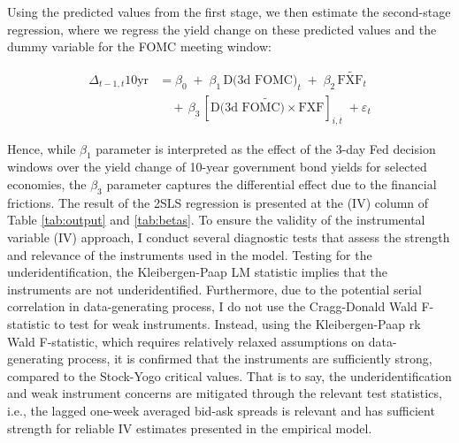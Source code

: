 \noindent Using the predicted values from the first stage, we then estimate the second-stage regression, where we regress the yield change on these predicted values and the dummy variable for the FOMC meeting window:

$$
\begin{aligned}
\Delta_{t-1,t}10\textrm{yr} &= \beta_0\;+\;\beta_1\,\textrm{D(3d FOMC)}_t\;+\;\beta_2\, \widetilde{\textrm{FXF}_t} \\&\quad +\,\beta_3 \, [\widetilde{\textrm{D(3d FOMC})\times\textrm{FXF}}]_{i,t}\; + \varepsilon_t
\end{aligned}
$$
\vspace{0.25cm}

Hence, while $\beta_1$ parameter is interpreted as the effect of the 3-day Fed decision windows over the yield change of 10-year government bond yields for selected economies, the $\beta_3$ parameter captures the differential effect due to the financial frictions. The result of the 2SLS regression is presented at the (IV) column of Table \ref{tab:output} and \ref{tab:betas}. To ensure the validity of the instrumental variable (IV) approach, I conduct several diagnostic tests that assess the strength and relevance of the instruments used in the model. Testing for the underidentification, the Kleibergen-Paap LM statistic implies that the instruments are not underidentified. Furthermore, due to the potential serial correlation in data-generating process, I do not use the Cragg-Donald Wald F-statistic to test for weak instruments. Instead, using the Kleibergen-Paap rk Wald F-statistic, which requires relatively relaxed assumptions on data-generating process, it is confirmed that the instruments are sufficiently strong, compared to the Stock-Yogo critical values. That is to say, the underidentification and weak instrument concerns are mitigated through the relevant test statistics, i.e., the lagged one-week averaged bid-ask spreads is relevant and has sufficient strength for reliable IV estimates presented in the empirical model.
